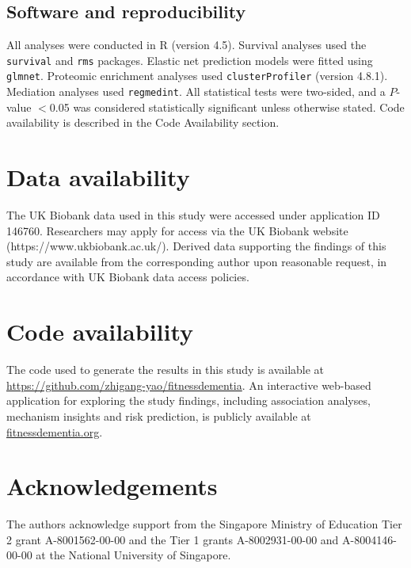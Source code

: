 \documentclass{article}
\begin{document}
\subsection*{Software and reproducibility}

All analyses were conducted in R (version 4.5). Survival analyses used the \texttt{survival} and \texttt{rms} packages. Elastic net prediction models were fitted using \texttt{glmnet}. Proteomic enrichment analyses used \texttt{clusterProfiler} (version 4.8.1). Mediation analyses used \texttt{regmedint}. All statistical tests were two-sided, and a $P$-value $<$0.05 was considered statistically significant unless otherwise stated. Code availability is described in the Code Availability section.

\section*{Data availability}
The UK Biobank data used in this study were accessed under application ID 146760. 
Researchers may apply for access via the UK Biobank website (https://www.ukbiobank.ac.uk/). 
Derived data supporting the findings of this study are available from the corresponding author upon reasonable request, in accordance with UK Biobank data access policies.

\section*{Code availability}
The code used to generate the results in this study is available at \href{https://github.com/zhigang-yao/fitnessdementia}{https://github.com/zhigang-yao/fitnessdementia}. 
An interactive web-based application for exploring the study findings, including association analyses, mechanism insights and risk prediction, is publicly available at \href{https://fitnessdementia.org}{fitnessdementia.org}.


\section*{Acknowledgements}
The authors acknowledge support from the Singapore Ministry of Education Tier 2 grant A-8001562-00-00 and the Tier 1 grants A-8002931-00-00 and A-8004146-00-00 at the National University of Singapore.
\end{document}
